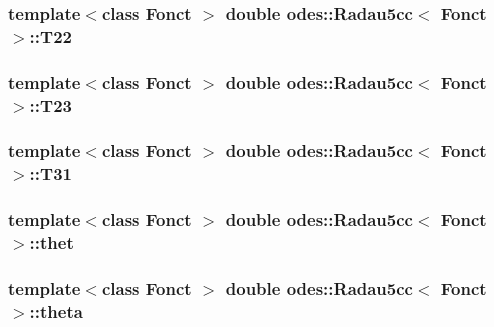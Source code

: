 \subsubsection[{T22}]{\setlength{\rightskip}{0pt plus 5cm}template$<$class Fonct $>$ double {\bf odes\+::\+Radau5cc}$<$ Fonct $>$\+::T22\hspace{0.3cm}{\ttfamily [private]}}\label{classodes_1_1Radau5cc_a1c4adb6f7b47032fe75bd53884a37ef3}
\hypertarget{classodes_1_1Radau5cc_a7a1d50f08a07a822568cbe9d52b75d45}{}
\subsubsection[{T23}]{\setlength{\rightskip}{0pt plus 5cm}template$<$class Fonct $>$ double {\bf odes\+::\+Radau5cc}$<$ Fonct $>$\+::T23\hspace{0.3cm}{\ttfamily [private]}}\label{classodes_1_1Radau5cc_a7a1d50f08a07a822568cbe9d52b75d45}
\hypertarget{classodes_1_1Radau5cc_ab80295b9270d7ac0dde3e7d36dcff866}{}
\subsubsection[{T31}]{\setlength{\rightskip}{0pt plus 5cm}template$<$class Fonct $>$ double {\bf odes\+::\+Radau5cc}$<$ Fonct $>$\+::T31\hspace{0.3cm}{\ttfamily [private]}}\label{classodes_1_1Radau5cc_ab80295b9270d7ac0dde3e7d36dcff866}
\hypertarget{classodes_1_1Radau5cc_a340c376fb3c4521c3c8e95a7b9911792}{}
\subsubsection[{thet}]{\setlength{\rightskip}{0pt plus 5cm}template$<$class Fonct $>$ double {\bf odes\+::\+Radau5cc}$<$ Fonct $>$\+::thet\hspace{0.3cm}{\ttfamily [private]}}\label{classodes_1_1Radau5cc_a340c376fb3c4521c3c8e95a7b9911792}
\hypertarget{classodes_1_1Radau5cc_af9475ed436133a308c22edfda6892988}{}
\subsubsection[{theta}]{\setlength{\rightskip}{0pt plus 5cm}template$<$class Fonct $>$ double {\bf odes\+::\+Radau5cc}$<$ Fonct $>$\+::theta\hspace{0.3cm}{\ttfamily [private]}}\label{classodes_1_1Radau5cc_af9475ed436133a308c22edfda6892988}
\hypertarget{classodes_1_1Radau5cc_adda256e4a50fe0b527b9a389ba06a9c4}{}

